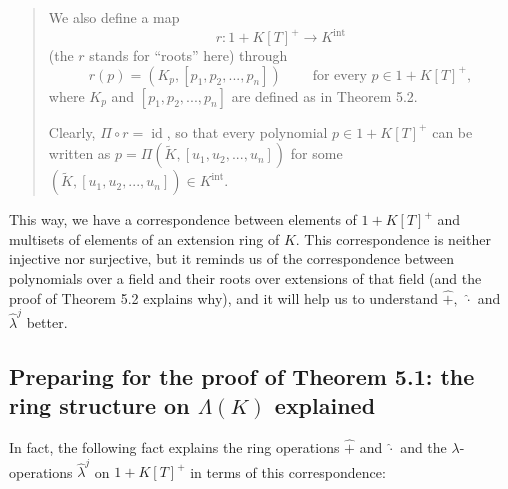 \documentclass[numbers=enddot,12pt,final,onecolumn,notitlepage]{scrartcl}%
\begin{document}
\begin{quote}
We also define a map%
\[
r:1+K\left[  T\right]  ^{+}\rightarrow K^{\operatorname*{int}}%
\]
(the $r$ stands for ``roots'' here) through
\[
r\left(  p\right)  =\left(  K_{p},\left[  p_{1},p_{2},...,p_{n}\right]
\right)  \ \ \ \ \ \ \ \ \ \ \text{for every }p\in1+K\left[  T\right]  ^{+},
\]
where $K_{p}$ and $\left[  p_{1},p_{2},...,p_{n}\right]  $ are defined as in
Theorem 5.2.

Clearly, $\Pi\circ r=\operatorname*{id}$, so that every polynomial
$p\in1+K\left[  T\right]  ^{+}$ can be written as $p=\Pi\left(  \widetilde{K}%
,\left[  u_{1},u_{2},...,u_{n}\right]  \right)  $ for some $\left(
\widetilde{K},\left[  u_{1},u_{2},...,u_{n}\right]  \right)  \in
K^{\operatorname*{int}}$.
\end{quote}

This way, we have a correspondence between elements of $1+K\left[  T\right]
^{+}$ and multisets of elements of an extension ring of $K$. This
correspondence is neither injective nor surjective, but it reminds us of the
correspondence between polynomials over a field and their roots over
extensions of that field (and the proof of Theorem 5.2 explains why), and it
will help us to understand $\widehat{+},$ $\widehat{\cdot}$ and
$\widehat{\lambda}^{j}$ better.

\subsection{Preparing for the proof of Theorem 5.1: the ring structure on
$\Lambda\left(  K\right)  $ explained}

In fact, the following fact explains the ring operations $\widehat{+}$ and
$\widehat{\cdot}$ and the $\lambda$-operations $\widehat{\lambda}^{j}$ on
$1+K\left[  T\right]  ^{+}$ in terms of this correspondence:
\end{document}
